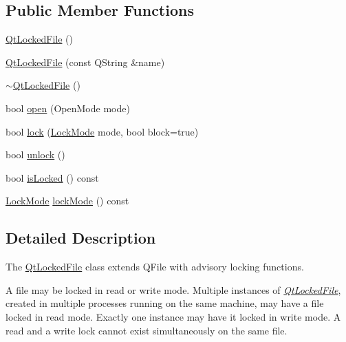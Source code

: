 \subsection*{Public Member Functions}
\begin{DoxyCompactItemize}
\item 
\hyperlink{class_qt_l_p___private_1_1_qt_locked_file_a69bf1d82b1ca46f97466634d8f9587aa}{Qt\+Locked\+File} ()
\item 
\hyperlink{class_qt_l_p___private_1_1_qt_locked_file_a8b7a228ae02dca4bb99743219d0cdb7b}{Qt\+Locked\+File} (const Q\+String \&name)
\item 
\hyperlink{class_qt_l_p___private_1_1_qt_locked_file_ae22e087171c094da6cfb3282e838c9d4}{$\sim$\+Qt\+Locked\+File} ()
\item 
bool \hyperlink{class_qt_l_p___private_1_1_qt_locked_file_a2e81bbaa7b1aaa83cf79284e66dbad79}{open} (Open\+Mode mode)
\item 
bool \hyperlink{class_qt_l_p___private_1_1_qt_locked_file_af7876c08254a16d00022939f2fb9a8b8}{lock} (\hyperlink{class_qt_l_p___private_1_1_qt_locked_file_ab9a54228983e33cf1fb8dace52141f26}{Lock\+Mode} mode, bool block=true)
\item 
bool \hyperlink{class_qt_l_p___private_1_1_qt_locked_file_abb4d7e6211d9e6e14afaa661818fb2bf}{unlock} ()
\item 
bool \hyperlink{class_qt_l_p___private_1_1_qt_locked_file_a0800b8ae9f4d268fe6968b9075f64bb3}{is\+Locked} () const
\item 
\hyperlink{class_qt_l_p___private_1_1_qt_locked_file_ab9a54228983e33cf1fb8dace52141f26}{Lock\+Mode} \hyperlink{class_qt_l_p___private_1_1_qt_locked_file_a0ae096d85cb722b1563521ad2b6dbde2}{lock\+Mode} () const
\end{DoxyCompactItemize}


\subsection{Detailed Description}
The \hyperlink{class_qt_l_p___private_1_1_qt_locked_file}{Qt\+Locked\+File} class extends Q\+File with advisory locking functions. 

A file may be locked in read or write mode. Multiple instances of {\itshape \hyperlink{class_qt_l_p___private_1_1_qt_locked_file}{Qt\+Locked\+File}}, created in multiple processes running on the same machine, may have a file locked in read mode. Exactly one instance may have it locked in write mode. A read and a write lock cannot exist simultaneously on the same file.

